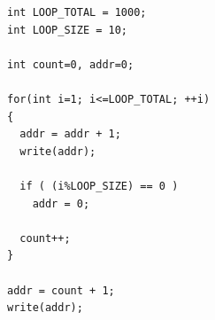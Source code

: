 \documentclass[12pt,twoside]{article}
\begin{document}
\begin{figure}[!ht]
\centering

\begin{subfigure}[b]{0.3\textwidth}

\lstset{linewidth=7.5cm}	
\begin{lstlisting}
int LOOP_TOTAL = 1000;
int LOOP_SIZE = 10;

int count=0, addr=0;

for(int i=1; i<=LOOP_TOTAL; ++i)
{
  addr = addr + 1;
  write(addr);
  
  if ( (i%LOOP_SIZE) == 0 )
    addr = 0;
  
  count++;
}

addr = count + 1;
write(addr);
\end{lstlisting}
	\caption{}
	\label{codigo_valida}
\end{subfigure}
\qquad \qquad
\begin{subfigure}[b]{0.3\textwidth}

\end{subfigure}
\end{figure}
\end{document}
